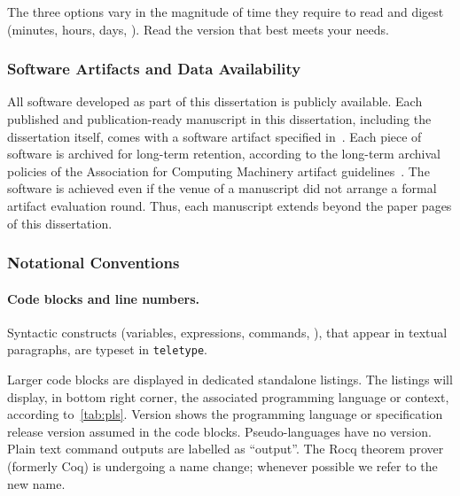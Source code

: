 The three options vary in the magnitude of time they require to read and digest (minutes, hours, days, \resp).
Read the version that best meets your needs.

\subsubsection{Software Artifacts and Data Availability}\label{subsub:sw}

All software developed as part of this dissertation is publicly available.
Each published and publication-ready manuscript in this dissertation, including the dissertation itself, comes with a software artifact specified in~.
Each piece of software is archived for long-term retention, according to the long-term archival policies of the Association for Computing Machinery artifact guidelines~\cite{acm_badging}.
The software is achieved even if the venue of a manuscript did not arrange a formal artifact evaluation round.
Thus, each manuscript extends beyond the paper pages of this dissertation.

\subsubsection{Notational Conventions}

\paragraph*{Code blocks and line numbers.}
Syntactic constructs (variables, expressions, commands, \etc), that appear in textual paragraphs, are typeset in \texttt{teletype}.

Larger code blocks are displayed in dedicated standalone listings.
The listings will display, in bottom right corner, the associated programming language or context, according to~\autoref{tab:pls}.
Version shows the programming language or specification release version assumed in the code blocks.
Pseudo-languages have no version.
Plain text command outputs are labelled as \enquote{output}.
The Rocq theorem prover (formerly Coq) is undergoing a name change; whenever possible we refer to the new name.

